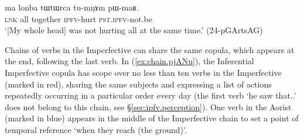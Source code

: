 \begin{exe}
\ex \label{ex:tumNAm.pWmaR}
\gll  ma lonba tɯtɯrca tu-mŋɤm pɯ-maʁ. \\
\textsc{lnk} all together \textsc{ipfv}-hurt \textsc{pst}.\textsc{ipfv}-not.be \\
\glt `[My whole head] was not hurting all at the same time.' (24-pGArtsAG)
\end{exe}

Chains of verbs in the Imperfective can share the same copula, which appears at the end, following the last verb. In (\ref{ex:chain.pjANu}), the Inferential Imperfective copula  has scope over no less than ten verbs in the Imperfective (marked in red), sharing the same subjects and expressing a list of actions repeatedly occurring in a particular order every day (the first verb  `he saw that..' does not belong to this chain, see §\ref{sec:ipfv.perception}). One verb in the Aorist (marked in blue) appears in the middle of the Imperfective chain to set a point of temporal reference `when they reach (the ground)'.

